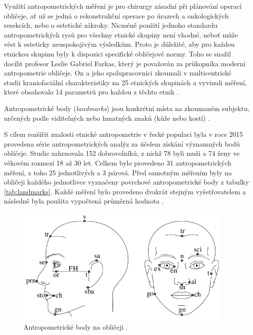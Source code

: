 \noindent Využití antropometrických měření je pro chirurgy zásadní při plánování operací obličeje, ať už se jedná o rekonstrukční operace po úrazech a onkologických resekcích, nebo o estetické zákroky. Nicméně použití jednoho standardu antropometrických rysů pro všechny etnické skupiny není vhodné, neboť může vést k esteticky neuspokojivým výsledkům. Proto je důležité, aby pro každou etnickou skupinu byly k dispozici specifické obličejové normy. Toho se snažil docílit profesor Leslie Gabriel Farkas, který je považován za průkopníka moderní antropometrie obličeje. On a jeho spolupracovníci zkoumali v multicentrické studii kraniofaciální charakteristiky na 25 etnických skupinách a vyvinuli měření, které obsahovalo 14 parametrů pro každou z těchto etnik \cite{Zacharopoulos2016}.

Antropometrické body (\textit{landmarks}) jsou konkrétní místa na zkoumaném subjektu, určených podle viditelných nebo hmatných znaků (kůže nebo kostí) \cite{DeCarlo1998}.

S cílem rozšířit znalosti etnické antropometrie v řecké populaci byla v roce 2015 provedena série antropometrických analýz za účelem získání významných bodů obličeje. Studie zahrnovala 152 dobrovolníků, z nichž 78 byli muži a 74 ženy ve věkovém rozmezí 18 až 30 let. Celkem bylo provedeno 31 antropometrických měření, z toho 25 jednotlivých a 3 párová. Před samotným měřením byly na obličeji každého jednotlivce vyznačeny povrchové antropometrické body z tabulky \ref{tab:landmarks}. Každé měření bylo provedeno dvakrát stejným vyšetřovatelem a následně byla použita vypočtená průměrná hodnota \cite{Zacharopoulos2016}.

\begin{figure}[H]
	\centering
	\includegraphics[width=0.95\textwidth]{obrazky-figures/Anthropometric-landmarks-on-the-face.png}
	\caption{Antropometrické body na obličeji \cite{DeCarlo1998}.}
        \label{fig:anthropometric-landmarks}
\end{figure}

